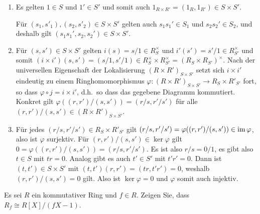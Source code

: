 \begin{solution}
  \begin{enumerate}
    \item
      Es gelten $1 \in S$ und $1' \in S'$ und somit auch $1_{R \times R'} = (1_R, 1_{R'}) \in S \times S'$.
      
      Für $(s_1, s'_1), (s_2, s'_2) \in S \times S'$ gelten auch $s_1 s_1' \in S_1$ und $s_2 s_2' \in S_2$, und deshalb gilt $(s_1 s_1', s_2, s_2') \in S \times S'$.
      
    \item
      Für $(s, s') \in S \times S'$ gelten $i(s) = s/1 \in R_S^\times$ und $i'(s') = s'/1 \in R_{S'}^\times$ und somit $(i \times i')(s,s') = (s/1, s'/1) \in R_S^\times \times R_{S'}^\times = (R_S \times R_{S'})^\times$.
      Nach der universellen Eigenschaft der Lokalisierung $(R \times R')_{S \times S'}$ setzt sich $i \times i'$ eindeutig zu einem Ringhomomorphismus $\varphi \colon (R \times R')_{S \times S'} \to R_S \times R'_{S'}$ fort, so dass $\varphi \circ j = i \times i'$, d.h.\ so dass das gegebene Diagramm kommutiert.
      Konkret gilt $\varphi((r,r')/(s,s')) = (r/s, r'/s')$ für alle $(r,r')/(s,s') \in (R \times R')_{S \times S'}$.
      
    \item
      Für jedes $(r/s, r'/s') \in R_S \times R'_{S'}$ gilt $(r/s, r'/s') = \varphi((r,r')/(s,s')) \in \operatorname{im} \varphi$, also ist $\varphi$ surjektiv.
      Für $(r,r')/(s,s') \in \ker \varphi$ gilt $0 = \varphi((r,r')/(s,s')) = (r/s, r'/s')$.
      Es ist also $r/s = 0/1$, es gibt also $t \in S$ mit $tr = 0$.
      Analog gibt es auch $t' \in S'$ mit $t'r' = 0$.
      Dann ist $(t,t') \in S \times S'$ mit $(t,t')(r,r') = (tr,t'r') = 0$, weshalb $(r,r')/(s,s') = 0$ gilt.
      Also ist $\ker \varphi = 0$ und $\varphi$ somit auch injektiv.
  \end{enumerate}
\end{solution}



\begin{question}
  Es sei $R$ ein kommutativer Ring und $f \in R$.
  Zeigen Sie, dass $R_f \cong R[X]/(fX-1)$.
\end{question}


